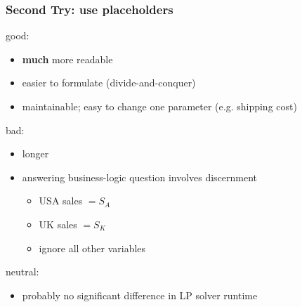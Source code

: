 \documentclass{beamer}
\begin{document}
\begin{frame} \frametitle{Second Try: use placeholders}
good:
\begin{itemize}
  \item \textbf{much} more readable
  \item easier to formulate (divide-and-conquer)
  \item maintainable; easy to change one parameter (e.g. shipping cost)
\end{itemize}
\vspace{.3cm}
bad:
\begin{itemize}
  \item longer
  \item answering business-logic question involves discernment
  \begin{itemize}
    \item USA sales $= S_A$
    \item UK sales $= S_K$
    \item ignore all other variables
  \end{itemize}
\end{itemize}
\vspace{.3cm}
neutral:
\begin{itemize}
  \item probably no significant difference in LP solver runtime
\end{itemize}
\end{frame}
\end{document}
